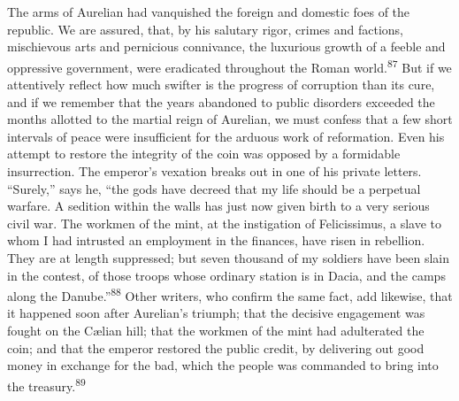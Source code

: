 

The arms of Aurelian had vanquished the foreign and domestic foes
of the republic. We are assured, that, by his salutary rigor,
crimes and factions, mischievous arts and pernicious connivance,
the luxurious growth of a feeble and oppressive government, were
eradicated throughout the Roman world.\textsuperscript{87} But if we attentively
reflect how much swifter is the progress of corruption than its
cure, and if we remember that the years abandoned to public
disorders exceeded the months allotted to the martial reign of
Aurelian, we must confess that a few short intervals of peace
were insufficient for the arduous work of reformation. Even his
attempt to restore the integrity of the coin was opposed by a
formidable insurrection. The emperor’s vexation breaks out in one
of his private letters. “Surely,” says he, “the gods have decreed
that my life should be a perpetual warfare. A sedition within the
walls has just now given birth to a very serious civil war. The
workmen of the mint, at the instigation of Felicissimus, a slave
to whom I had intrusted an employment in the finances, have risen
in rebellion. They are at length suppressed; but seven thousand
of my soldiers have been slain in the contest, of those troops
whose ordinary station is in Dacia, and the camps along the
Danube.”\textsuperscript{88} Other writers, who confirm the same fact, add
likewise, that it happened soon after Aurelian’s triumph; that
the decisive engagement was fought on the Cælian hill; that the
workmen of the mint had adulterated the coin; and that the
emperor restored the public credit, by delivering out good money
in exchange for the bad, which the people was commanded to bring
into the treasury.\textsuperscript{89}




